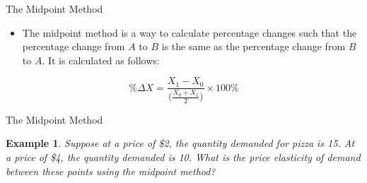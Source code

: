 \documentclass[xcolor={dvipsnames},pdf, hyperref={colorlinks=true, citecolor=ForestGreen, linkcolor=BlueViolet, urlcolor=Magenta}]{beamer}
\newtheorem{exmp}{Example}[section]
\newcommand{\ddp}[1]{{\textcolor{ForestGreen}{#1}}}
\begin{document}
\begin{frame}{The Midpoint Method}
\begin{itemize}

\item	The midpoint method is a way to calculate percentage changes such that the percentage change from $A$ to $B$ is the same as the percentage change from $B$ to $A$. It is calculated as follows:

\end{itemize}	
	
	\begin{equation*}
	\%\Delta X =  \frac{X_1 - X_0}{\Big(\frac{X_0+X_1}{2}\Big)} \times 100\%
	\end{equation*}


	\end{frame}


\begin{frame}[t]{The Midpoint Method}
	\begin{exmp} 
		Suppose at a price of \$2, the quantity demanded for pizza is 15. At a price of \$4, the quantity demanded is 10. What is the price elasticity of demand between these points using the midpoint method?
	\end{exmp}
	
\pause	\ddp{\[\%\Delta Q_D = \frac{15 - 10}{(15+10)/2} \times 100\% = 40\%\] \\
\pause	\[\%\Delta P = \frac{2-4}{(2+4)/2} \times 100\% = -66.7\%\] \\
\pause	\[\Rightarrow |	\mathcal{E}_d^p | = 40/66.7 = .60\]}
	\end{frame}
	
\end{document}
